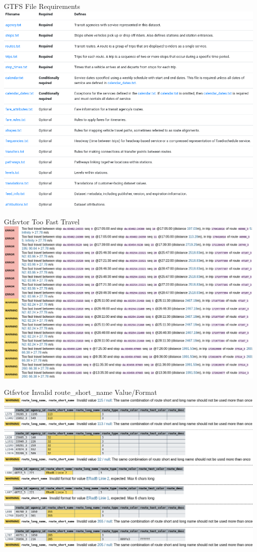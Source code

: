 \begin{frame}{GTFS File Requirements}
\includegraphics[width=0.95\paperwidth]{gtfs-validation/gtfs-spec-file-requirements.png}
\end{frame}

\begin{frame}{Gtfsvtor Too Fast Travel}
\includegraphics[width=0.95\paperwidth]{gtfs-validation/gtfsvtor-report-vbn-top-dhid-too-fast.png}
\end{frame}

\begin{frame}{Gtfsvtor Invalid route\_short\_name Value/Format}
\includegraphics[width=0.95\paperwidth]{gtfs-validation/gtfsvtor-report-vbn-top-dhid-invalid.png}
\end{frame}

